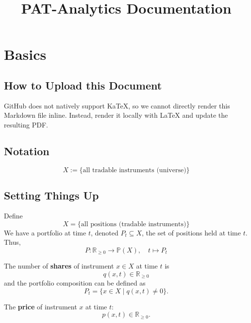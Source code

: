 \documentclass[12pt]{article}
\title{PAT-Analytics Documentation}
\author{}
\date{}
\begin{document}
\maketitle

\tableofcontents
\newpage

\section{Basics}

\subsection{How to Upload this Document}
GitHub does not natively support KaTeX, so we cannot directly render this Markdown file inline.  
Instead, render it locally with \LaTeX{} and update the resulting PDF.

\subsection{Notation}

\begin{equation}
X := \{\text{all tradable instruments (universe)}\}
\label{eq:universe}
\end{equation}

\subsection{Setting Things Up}
Define
\begin{equation}
X = \{ \text{all positions (tradable instruments)} \}
\end{equation}
We have a portfolio at time $ t $, denoted $ P_t \subseteq X $, the set of positions held at time $ t $. Thus,
\begin{equation}
P : \mathbb{R}_{\geq 0} \to \mathbb{P}(X), \quad t \mapsto P_t
\label{eq:portfolio_function}
\end{equation}

The number of \textbf{shares} of instrument $ x \in X $ at time $ t $ is
\begin{equation}
q(x,t) \in \mathbb{R}_{\geq 0}
\label{eq:quantity}
\end{equation}
and the portfolio composition can be defined as
\begin{equation}
P_t = \{x \in X \mid q(x,t) \neq 0\}.
\label{eq:positions_nonzero}
\end{equation}

The \textbf{price} of instrument $ x $ at time $ t $:
\begin{equation}
p(x,t) \in \mathbb{R}_{\geq 0}.
\label{eq:price}
\end{equation}
\end{document}
